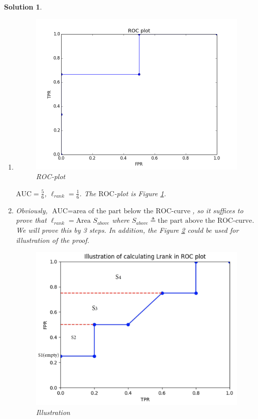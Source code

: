 \documentclass[a4paper,UTF8]{article}
\numberwithin{equation}{section}
\newtheorem*{mySol}{Solution}
\begin{document}
\begin{mySol}
\begin{enumerate}[(1)]
\item 
\begin{figure}[!bh]\label{pic1}
\caption{ROC-plot}
\centering
\includegraphics[scale=0.8]{ml1.png}

\end{figure}

$\mbox{AUC}=\frac{5}{6}$, $\ell_{rank}=\frac{1}{6}$. The $\mbox{ROC}$-plot is Figure \ref{pic1}.

\item 
Obviously, $\mbox{AUC} = \text{area of the part below the ROC-curve}$, so it suffices to prove that  $\ell_{rank} = \text{Area } S_{above}$  where $S_{above}\triangleq \text{the part above the }\mbox{ROC} \text{-curve}$.\\
We will prove this by 3 steps. In addition, the Figure \ref{pic2} could be used for illustration of the proof.
\begin{figure}[!bh]\label{pic2}
\caption{Illustration}
\centering
\includegraphics[scale=0.2]{ml2.png}


\end{figure}
\end{enumerate}
\end{mySol}
\end{document}
